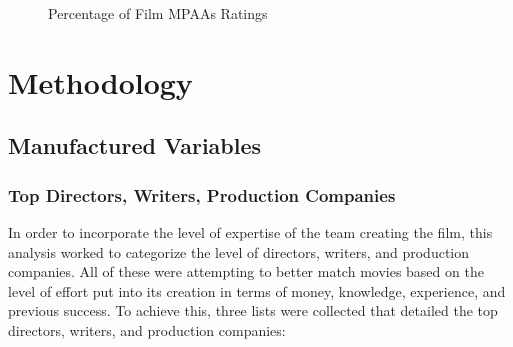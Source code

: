 \documentclass[
]{agujournal2019}
\begin{document}
\begin{figure}


\caption{\label{fig-5}Percentage of Film MPAAs Ratings}

\end{figure}%

\section{Methodology}\label{sec-meth}

\subsection{Manufactured Variables}\label{manufactured-variables}

\subsubsection{Top Directors, Writers, Production
Companies}\label{top-directors-writers-production-companies}

In order to incorporate the level of expertise of the team creating the
film, this analysis worked to categorize the level of directors,
writers, and production companies. All of these were attempting to
better match movies based on the level of effort put into its creation
in terms of money, knowledge, experience, and previous success. To
achieve this, three lists were collected that detailed the top
directors, writers, and production companies:
\end{document}
